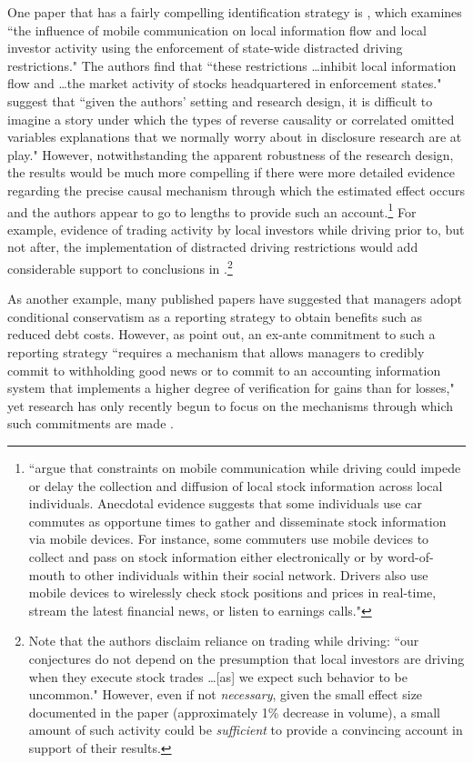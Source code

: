 \documentclass[12pt,reqno,titlepage]{amsart}
\begin{document}
\begin{doublespace}
One paper that has a fairly compelling identification strategy is \citet{Brown:2015ik}, which examines ``the influence of mobile communication on local information flow and local investor activity using the enforcement of state-wide distracted driving restrictions."
The authors find that ``these restrictions \dots inhibit local information flow and \dots the market activity of stocks headquartered in enforcement states."
\citet[p.\,229]{Miller:2015ec} suggest that ``given the authors' setting and research design, it is difficult to imagine a story under which the types of reverse causality or correlated omitted variables explanations that we normally worry about in disclosure research are at play."
However, notwithstanding the apparent robustness of the research design, the results would be much more compelling if there were more detailed evidence regarding the precise causal mechanism through which the estimated effect occurs and the authors appear to go to lengths to provide such an account.\footnote{
\citet[pp.\,277-278]{Brown:2015ik} ``argue that constraints on mobile communication while driving could impede or delay the collection and diffusion of local stock information across local individuals. 
Anecdotal evidence suggests that some individuals use car commutes as opportune times to gather and disseminate stock information via mobile devices. 
For instance, some commuters use mobile devices to collect and pass on stock information either electronically or by word-of-mouth to other individuals within their social network.
Drivers also use mobile devices to wirelessly check stock positions and prices in real-time, stream the latest financial news, or listen to earnings calls."}
For example, evidence of trading activity by local investors while driving prior to, but not after, the implementation of distracted driving restrictions would add considerable support to conclusions in \citet{Brown:2015ik}.\footnote{
Note that the authors disclaim reliance on trading while driving: ``our conjectures do not depend on the presumption that local investors are driving when they execute stock trades \dots [as] we expect such behavior to be uncommon."
However, even if not \emph{necessary}, given the small effect size documented in the paper (approximately 1\% decrease in volume), a small amount of such activity could be \emph{sufficient} to provide a convincing account in support of their results.}


As another example, many published papers have suggested that managers adopt conditional conservatism as a reporting strategy to obtain benefits such as reduced debt costs.
However, as  \citet[p.\,317]{Beyer:2010cj}  point out, an ex-ante commitment to such a reporting strategy ``requires a mechanism that allows managers to credibly commit to withholding good news or to commit to an accounting information system that implements a higher degree of verification for gains than for losses," yet research has only recently begun to focus on the mechanisms through which such commitments are made \citep[e.g.,][]{Erkens:2014hj}. 


\end{doublespace}
\end{document}
